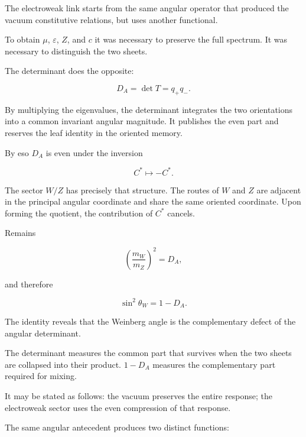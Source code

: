 The electroweak link starts from the same angular operator that produced the vacuum constitutive relations, but uses another functional.\par

To obtain \(\mu\), \(\varepsilon\), \(Z\), and \(c\) it was necessary to preserve the full spectrum. It was necessary to distinguish the two sheets.\par

The determinant does the opposite:\par

\[
D_A=\det T=q_+q_-.
\]

By multiplying the eigenvalues, the determinant integrates the two orientations into a common invariant angular magnitude. It publishes the even part and reserves the leaf identity in the oriented memory.\par

By eso \(D_A\) is even under the inversion\par

\[
C^*\longmapsto-C^*.
\]

The sector \(W/Z\) has precisely that structure. The routes of \(W\) and \(Z\) are adjacent in the principal angular coordinate and share the same oriented coordinate. Upon forming the quotient, the contribution of \(C^*\) cancels.\par

Remains\par

\[
\left(\frac{m_W}{m_Z}\right)^2
=
D_A,
\]

and therefore\par

\[
\sin^2\theta_W
=
1-D_A.
\]

The identity reveals that the Weinberg angle is the complementary defect of the angular determinant.\par

The determinant measures the common part that survives when the two sheets are collapsed into their product. \(1-D_A\) measures the complementary part required for mixing.\par

It may be stated as follows: the vacuum preserves the entire response; the electroweak sector uses the even compression of that response.\par

The same angular antecedent produces two distinct functions:\par


